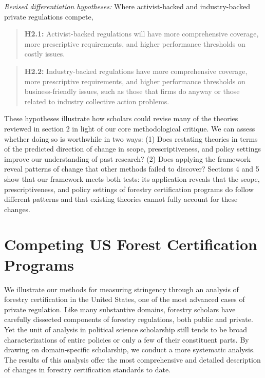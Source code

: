 \documentclass[
      12pt,
            Review ]{article}
\begin{document}
\emph{Revised differentiation hypotheses:} Where activist-backed and
industry-backed private regulations compete,

\begin{quote}
\textbf{H2.1:} Activist-backed regulations will have more comprehensive
coverage, more prescriptive requirements, and higher performance
thresholds on costly issues.
\end{quote}

\begin{quote}
\textbf{H2.2:} Industry-backed regulations have more comprehensive
coverage, more prescriptive requirements, and higher performance
thresholds on business-friendly issues, such as those that firms do
anyway or those related to industry collective action problems.
\end{quote}

These hypotheses illustrate how scholars could revise many of the
theories reviewed in section 2 in light of our core methodological
critique. We can assess whether doing so is worthwhile in two ways: (1)
Does restating theories in terms of the predicted direction of change in
scope, prescriptiveness, and policy settings improve our understanding
of past research? (2) Does applying the framework reveal patterns of
change that other methods failed to discover? Sections 4 and 5 show that
our framework meets both tests: its application reveals that the scope,
prescriptiveness, and policy settings of forestry certification programs
do follow different patterns and that existing theories cannot fully
account for these changes.

\section{Competing US Forest Certification
Programs}\label{competing-us-forest-certification-programs}

We illustrate our methods for measuring stringency through an analysis
of forestry certification in the United States, one of the most advanced
cases of private regulation. Like many substantive domains, forestry
scholars have carefully dissected components of forestry regulations,
both public and private. Yet the unit of analysis in political science
scholarship still tends to be broad characterizations of entire policies
or only a few of their constituent parts. By drawing on domain-specific
scholarship, we conduct a more systematic analysis. The results of this
analysis offer the most comprehensive and detailed description of
changes in forestry certification standards to date.
\end{document}
